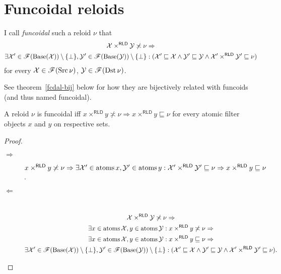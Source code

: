 \section{\label{fcd-rld}Funcoidal reloids}
\begin{defn}
I call \emph{funcoidal} such a reloid $\nu$
that
\begin{multline*}
\mathcal{X}\times^{\mathsf{RLD}}\mathcal{Y}\not\asymp\nu\Rightarrow\\
\exists\mathcal{X}'\in\mathscr{F}(\operatorname{Base}(\mathcal{X}))\setminus\{\bot\},\mathcal{Y}'\in\mathscr{F}(\operatorname{Base}(\mathcal{Y}))\setminus\{\bot\}:(\mathcal{X}'\sqsubseteq\mathcal{X}\land\mathcal{Y}'\sqsubseteq\mathcal{Y}\land\mathcal{X}'\times^{\mathsf{RLD}}\mathcal{Y}'\sqsubseteq\nu)
\end{multline*}
for every $\mathcal{X}\in\mathscr{F}(\operatorname{Src}\nu)$, $\mathcal{Y}\in\mathscr{F}(\operatorname{Dst}\nu)$.\end{defn}
\begin{rem}
See theorem~\ref{fcdal-bij} below for how they are bijectively related with funcoids (and thus named funcoidal).
\end{rem}
\begin{prop}
A reloid $\nu$ is funcoidal iff $x\times^{\mathsf{RLD}}y\nasymp\nu\Rightarrow x\times^{\mathsf{RLD}}y\sqsubseteq\nu$
for every atomic filter objects $x$ and $y$ on respective sets.\end{prop}
\begin{proof}
~
\begin{description}
\item [{$\Rightarrow$}] $x\times^{\mathsf{RLD}}y\not\asymp\nu\Rightarrow\exists\mathcal{X}'\in\operatorname{atoms} x,\mathcal{Y}'\in\operatorname{atoms} y:\mathcal{X}'\times^{\mathsf{RLD}}\mathcal{Y}'\sqsubseteq\nu\Rightarrow x\times^{\mathsf{RLD}}y\sqsubseteq\nu$.
\item [{$\Leftarrow$}] ~
\begin{multline*}
\mathcal{X}\times^{\mathsf{RLD}}\mathcal{Y}\not\asymp\nu\Rightarrow\\
\exists x\in\operatorname{atoms}\mathcal{X},y\in\operatorname{atoms}\mathcal{Y}:x\times^{\mathsf{RLD}}y\not\asymp\nu\Rightarrow\\
\exists x\in\operatorname{atoms}\mathcal{X},y\in\operatorname{atoms}\mathcal{Y}:x\times^{\mathsf{RLD}}y\sqsubseteq\nu\Rightarrow\\
\exists\mathcal{X}'\in\mathscr{F}(\operatorname{Base}(\mathcal{X}))\setminus\{\bot\},\mathcal{Y}'\in\mathscr{F}(\operatorname{Base}(\mathcal{Y}))\setminus\{\bot\}:(\mathcal{X}'\sqsubseteq\mathcal{X}\land\mathcal{Y}'\sqsubseteq\mathcal{Y}\land\mathcal{X}'\times^{\mathsf{RLD}}\mathcal{Y}'\sqsubseteq\nu).
\end{multline*}

\end{description}
\end{proof}

